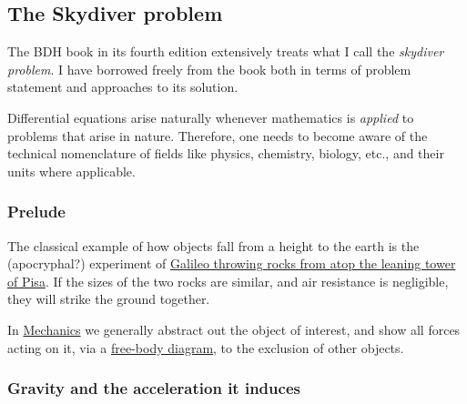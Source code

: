 \documentclass[
  a4paper,
]{article}
\begin{document}
\subsection{The Skydiver problem}\label{the-skydiver-problem}

The BDH book in its fourth edition extensively treats what I call the
\emph{skydiver problem}. I have borrowed freely from the book both in
terms of problem statement and approaches to its solution.

Differential equations arise naturally whenever mathematics is
\emph{applied} to problems that arise in nature. Therefore, one needs to
become aware of the technical nomenclature of fields like physics,
chemistry, biology, etc., and their units where applicable.

\subsubsection{Prelude}\label{prelude}

The classical example of how objects fall from a height to the earth is
the (apocryphal?) experiment of
\href{https://en.wikipedia.org/wiki/Galileo's_Leaning_Tower_of_Pisa_experiment}{Galileo
throwing rocks from atop the leaning tower of Pisa}. If the sizes of the
two rocks are similar, and air resistance is negligible, they will
strike the ground together.

In \href{https://en.wikipedia.org/wiki/Mechanics}{Mechanics} we
generally abstract out the object of interest, and show all forces
acting on it, via a
\href{https://www.physicsclassroom.com/class/newtlaws/Lesson-2/Drawing-Free-Body-Diagrams}{free-body
diagram}, to the exclusion of other objects.

\subsubsection{Gravity and the acceleration it
induces}\label{gravity-and-the-acceleration-it-induces}
\end{document}
